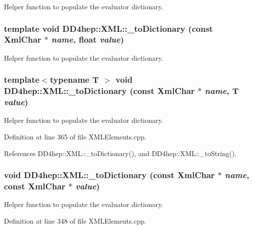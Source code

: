 Helper function to populate the evaluator dictionary. \hypertarget{group___d_d4_h_e_p___x_m_l_gac7be63582e2bd7ad2bad66544cb45ede}{
\subsubsection[{\_\-toDictionary}]{\setlength{\rightskip}{0pt plus 5cm}template void DD4hep::XML::\_\-toDictionary (const XmlChar $\ast$ {\em name}, \/  float {\em value})}}
\label{group___d_d4_h_e_p___x_m_l_gac7be63582e2bd7ad2bad66544cb45ede}


Helper function to populate the evaluator dictionary. \hypertarget{group___d_d4_h_e_p___x_m_l_ga45b176504b155d5f47b9c7cfdc5a9255}{
\subsubsection[{\_\-toDictionary}]{\setlength{\rightskip}{0pt plus 5cm}template$<$typename T $>$ void DD4hep::XML::\_\-toDictionary (const XmlChar $\ast$ {\em name}, \/  {\bf T} {\em value})}}
\label{group___d_d4_h_e_p___x_m_l_ga45b176504b155d5f47b9c7cfdc5a9255}


Helper function to populate the evaluator dictionary. 

Definition at line 365 of file XMLElements.cpp.

References DD4hep::XML::\_\-toDictionary(), and DD4hep::XML::\_\-toString().\hypertarget{group___d_d4_h_e_p___x_m_l_ga453206d36ab8257b39337846e5a1795d}{
\subsubsection[{\_\-toDictionary}]{\setlength{\rightskip}{0pt plus 5cm}void DD4hep::XML::\_\-toDictionary (const XmlChar $\ast$ {\em name}, \/  const XmlChar $\ast$ {\em value})}}
\label{group___d_d4_h_e_p___x_m_l_ga453206d36ab8257b39337846e5a1795d}


Helper function to populate the evaluator dictionary. 

Definition at line 348 of file XMLElements.cpp.

